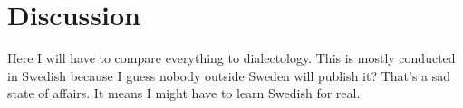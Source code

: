 \chapter{Discussion}
Here I will have to compare everything to dialectology. This is mostly
conducted in Swedish because I guess nobody outside Sweden will
publish it? That's a sad state of affairs. It means I might have to
learn Swedish for real.
